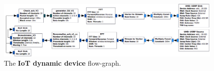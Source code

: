 \begin{figure}[!h]
    \includegraphics[width=1.00\textwidth]{2-Chapters/4-Chapter/Images/USRP_TX_SU__v1__simple_grc.png}
    \caption{The \textbf{IoT dynamic device} flow-graph.}
    \label{fig:4app:USRP_TX_SU__v1__simple_grc}
\end{figure}
